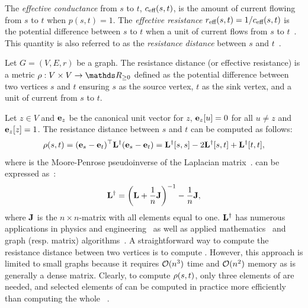 The \emph{effective conductance} from $s$ to $t$, $c_{\text{eff}}(s, t)$, is the
amount of current flowing from $s$ to $t$ when $p(s,t) = 1$.
The \emph{effective resistance} $r_{\text{eff}}(s,t) = 1/c_{\text{eff}}(s,t)$
is the potential difference between $s$ to $t$ when a unit of current flows
from $s$ to $t$~\cite[Ch. IX]{DBLP:books/daglib/0009415}.
This quantity is also referred to as the \emph{resistance
distance} between $s$ and $t$~\cite{DBLP:journals/siamrev/GhoshBS08}.

\begin{definition}
\label{def:resistance-distance}
Let $G = (V, E, r)$ be a graph. The resistance distance (or
effective resistance) is a metric $\rdist : V \times V \to \real_{\ge 0}$
defined as the potential difference between two vertices $s$ and $t$ ensuring
$s$ as the source vertex, $t$ as the sink vertex, and a unit of current from
$s$ to $t$.
\end{definition}

Let $z\in V$ and $\mathbf{e}_{z}$ be the canonical unit vector for $z$, \ie
$\mathbf{e}_z[u] = 0$ for all $u \neq z$ and $\mathbf{e}_{z}[z] = 1$.
The resistance distance between $s$ and $t$ can be computed as follows:
%
\begin{equation}
\label{eq:eff-res-laplinv}
\rho(s, t) = (\mathbf{e}_{s} - \mathbf{e}_{t})^\top\mathbf{L}^\dagger(\mathbf{e}_{s} - \mathbf{e}_{t}) =
\mathbf{L}^\dagger[s,s] - 2\mathbf{L}^\dagger[s,t] + \mathbf{L}^\dagger[t,t],
\end{equation}
%
where \Linv is the Moore-Penrose pseudoinverse of the Laplacian
matrix~\cite[p. 290]{DBLP:books/daglib/0086372}.
\Linv can be expressed as~\cite{van2017pseudoinverse}:
%
\begin{equation}
\label{eq:laplinv}
\Linv = \roundb{\Lapl + \frac1n \Ones}^{-1} - \frac1n \Ones,
\end{equation}
%
where $\mathbf{J}$ is the $n \times n$-matrix with all elements equal to one.
$\mathbf{L}^\dagger$ has numerous applications in physics and engineering~\cite{van2017pseudoinverse}
as well as applied mathematics~\cite{DBLP:books/daglib/0086372}
and graph (resp. matrix) algorithms~\cite{DBLP:conf/www/0002PSYZ19}.
A straightforward way to compute the resistance distance between two
vertices is to compute \Linv. However, this approach is limited to small graphs
because it requires $\mathcal{O}(n^3)$ time and $\mathcal{O}(n^2)$ memory as \Linv is generally
a dense matrix.
Clearly, to compute $\rho(s, t)$, only three elements of \Linv are needed, and
selected elements of \Linv can be computed in practice more efficiently than
computing the whole
\Linv~\cite{DBLP:journals/pc/Jacquelin0018,DBLP:journals/toms/LinYMLYE11}.

